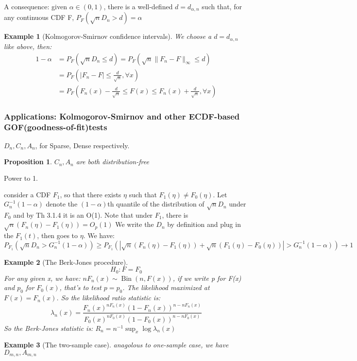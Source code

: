 \documentclass{ctexart}
\newtheorem{example}{Example}[subsection]
\newtheorem{proposition}{Proposition}[subsection]
\begin{document}
A consequence: given \(\alpha\in (0,1)\), there is a well-defined \(d=d_{\alpha,n}\) such that, for any 
continuous CDF F, \(P_{F}(\sqrt{n}D_{n}>d)=\alpha\)   
\begin{example}[Kolmogorov-Smirnov confidence intervals]
  We choose a \(d=d_{\alpha,n}\) like above, then: 
  \begin{align*}
    1-\alpha&=P_{F}(\sqrt{n}D_{n}\le d)=P_{F}(\sqrt{n}\| F_{n}-F\|_{\infty}\le d)\\
    &=P_{F}(|F_{n}-F|\le \frac{d}{\sqrt{n}},\forall x)\\
    &=P_{F}(F_{n}(x)-\frac{d}{\sqrt{n}}\le F(x)\le F_{n}(x)+\frac{d}{\sqrt{n}},\forall x)
  \end{align*}
\end{example}
\subsubsection{Applications: Kolmogorov-Smirnov and other ECDF-based GOF(goodness-of-fit)tests}
\(D_{n},C_{n},A_{n}\), for Sparse, Dense respectively. 

\begin{proposition}
  \(C_{n},A_{n}\) are both distribution-free 
\end{proposition}
Power to 1. 

consider a CDF \(F_{1}\), so that there exists \(\eta\) such that \(F_{1}(\eta)\neq F_{0}(\eta)\). Let \(G_{n}^{-1}(1-\alpha)\) denote the \((1-\alpha)\)th quantile of the distribution of 
\(\sqrt{n}D_{n}\) under \(F_{0}\) and by Th 3.1.4 it is an O(1). Note that under \(F_{1}\), there is \(\sqrt{n}(F_{n}(\eta)-F_{1}(\eta))=O_{p}(1)\)  
We write the \(D_{n}\) by definition and plug in the \(F_{1}(t)\), then goes to \(\eta\). 
We have: 
\[
P_{F_{1}}(\sqrt{n}D_{n}>G_{n}^{-1}(1-\alpha))\geq P_{F_{1}}(|\sqrt{n}(F_{n}(\eta)-F_{1}(\eta))+\sqrt{n}(F_{1}(\eta)-F_{0}(\eta))|>G_{n}^{-1}(1-\alpha))\to 1
\]                                                                                                                            
\begin{example}[The Berk-Jones procedure]
  \[
  H_{0}: F=F_{0}
  \] 
  For any given x, we have: \(nF_{n}(x)\sim \operatorname{Bin}(n,F(x))\), if we write p for F(x) and \(p_{0}\) for \(F_{0}(x)\), that's to test \(p=p_{0}\).
  The likelihood maximized at \(F(x)=F_{n}(x)\). So the likelihood ratio statistic is: 
  \[
  \lambda_{n}(x)=\frac{F_{n}(x)^{nF_{n}(x)}(1-F_{n}(x))^{n-nF_{n}(x)}}{F_{0}(x)^{nF_{0}(x)}(1-F_{0}(x))^{n-nF_{0}(x)}}
  \] 
So the Berk-Jones statistic is: \(R_{n}=n ^{-1} \sup_{x}\log \lambda_{n}(x)\) 
\end{example}
\begin{example}[The two-sample case]
  anagolous to one-sample case, we have \(D_{m,n}, A_{m,n}\) 
\end{example}
\end{document}
